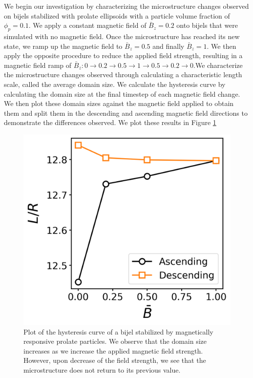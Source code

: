 We begin our investigation by characterizing the microstructure changes observed on bijels stabilized with prolate ellipsoids with a 
particle volume fraction of $\phi_p = 0.1$. We apply a constant magnetic field of $\bar{B}_z = 0.2$ onto bijels that were simulated 
with no magnetic field. Once the microstructure has reached its new state, we ramp up the magnetic field to $\bar{B}_z = 0.5$ and 
finally $\bar{B}_z = 1$. We then apply the opposite procedure to reduce the applied field strength, resulting in a magnetic field 
ramp of $\bar{B}_z: 0 \rightarrow 0.2 \rightarrow 0.5 \rightarrow 1 \rightarrow 0.5 \rightarrow 0.2 \rightarrow 0$.We characterize the 
microstructure changes observed through calculating a characteristic length scale, called the average domain size. We calculate the hysteresis 
curve by calculating the domain size at the final timestep of each magnetic field change. We then plot these domain sizes against the magnetic field 
applied to obtain them and split them in the descending and ascending magnetic field directions to demonstrate the differences observed. We plot 
these results in Figure \ref{fig:hysteresis_curve}

\begin{figure} 
    \centering 
    \includegraphics[scale=0.5]{../figures/results/paper2/hysteresis_curve.png} 
    \caption{Plot of the hysteresis curve of a bijel stabilized by magnetically responsive prolate particles. We observe that the domain size increases as we increase the applied
    magnetic field strength. However, upon decrease of the field strength, we see that the microstructure does not return to its previous value.} 
    \label{fig:hysteresis_curve} 
\end{figure}

